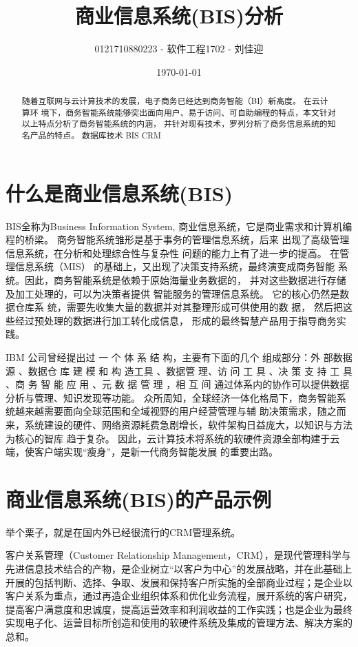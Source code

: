 \documentclass[lang=cn,11pt,numbers]{elegantpaper}
\title{商业信息系统(BIS)分析}
\author{0121710880223 - 软件工程1702 - 刘佳迎}
\date{\today}
\newcommand{\upcite}[1]{\textsuperscript{\textsuperscript{\cite{#1}}}}
\begin{document}
\maketitle

\begin {abstract} 

随着互联网与云计算技术的发展，电子商务已经达到商务智能（BI）新高度。 在云计算环
境下，商务智能系统能够突出面向用户、易于访问、可自助编程的特点，本文针对以上特点分析了商务智能系统的内涵，
并针对现有技术，罗列分析了商务信息系统的知名产品的特点。
\keywords 
{ 数据库技术 \quad
BIS \quad
CRM \quad
}
\end{abstract}


\section{什么是商业信息系统(BIS)}

BIS全称为Business Information System, 商业信息系统，它是商业需求和计算机编程的桥梁。
商务智能系统雏形是基于事务的管理信息系统，后来
出现了高级管理信息系统，在分析和处理综合性与复杂性
问题的能力上有了进一步的提高。 在管理信息系统（MIS）
的基础上，又出现了决策支持系统，最终演变成商务智能
系统。因此，商务智能系统是依赖于原始海量业务数据的，
并对这些数据进行存储及加工处理的，可以为决策者提供
智能服务的管理信息系统。 它的核心仍然是数据仓库系
统，需要先收集大量的数据并对其整理形成可供使用的数
据， 然后把这些经过预处理的数据进行加工转化成信息，
形成的最终智慧产品用于指导商务实践\upcite{one}。 

IBM 公司曾经提出过 一 个 体 系 结 构\upcite{two}，主要有下面的几个 组成部分：外
部数据源 、数据仓 库 建 模 和 构 造工具 、数据管 理、访 问 工
具 、决 策 支 持 工 具 、商 务 智 能 应 用 、元 数 据 管 理 ，相 互 间
通过体系内的协作可以提供数据分析与管理、知识发现等功能。
众所周知，全球经济一体化格局下，商务智能系统越来越需要面向全球范围和全域视野的用户经营管理与辅
助决策需求，随之而来，系统建设的硬件、网络资源耗费急剧增长，软件架构日益庞大，以知识与方法为核心的智库
趋于复杂。 因此，云计算技术将系统的软硬件资源全部构建于云端，使客户端实现“瘦身”，是新一代商务智能发展
的重要出路。



\section{商业信息系统(BIS)的产品示例}

举个栗子，就是在国内外已经很流行的CRM管理系统。

客户关系管理（Customer Relationship Management，CRM），是现代管理科学与先进信息技术结合的产物，是企业树立“以客户为中心”的发展战略，并在此基础上开展的包括判断、选择、争取、发展和保持客户所实施的全部商业过程；是企业以客户关系为重点，通过再造企业组织体系和优化业务流程，展开系统的客户研究，提高客户满意度和忠诚度，提高运营效率和利润收益的工作实践；也是企业为最终实现电子化、运营目标所创造和使用的软硬件系统及集成的管理方法、解决方案的总和。
\end{document}
